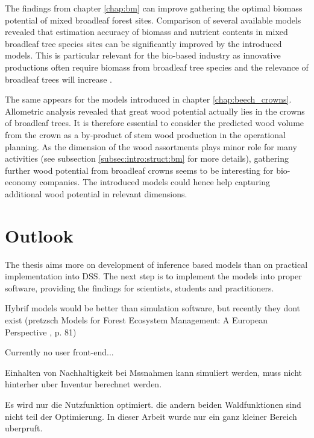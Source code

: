The findings from chapter \ref{chap:bm} can improve gathering the optimal biomass potential of mixed broadleaf forest sites. Comparison of several available models revealed that estimation accuracy of biomass and nutrient contents in mixed broadleaf tree species sites can be significantly improved by the introduced models. This is particular relevant for the bio-based industry as innovative productions often require biomass from broadleaf tree species \citep[p. 1]{auer_2016} and the relevance of broadleaf trees will increase \citep{ti_2014}.

The same appears for the models introduced in chapter \ref{chap:beech_crowns}. Allometric analysis revealed that great wood potential actually lies in the crowns of broadleaf trees. It is therefore essential to consider the predicted wood volume from the crown as a by-product of stem wood production in the operational planning. As the dimension of the wood assortments plays minor role for many activities (see subsection \ref{subsec:intro:struct:bm} for more details), gathering further wood potential from broadleaf crowns seems to be interesting for bio-economy companies. The introduced models could hence help capturing additional wood potential in relevant dimensions.


\section{Outlook}
\label{sec:discussion:outlook}
The thesis aims more on development of inference based models than on practical implementation into DSS. The next step is to implement the models into proper software, providing the findings for scientists, students and practitioners.

Hybrif models would be better than simulation software, but recently they dont exist (pretzsch Models for Forest Ecosystem Management: A European Perspective
, p. 81)

Currently no user front-end...

Einhalten von Nachhaltigkeit bei Mssnahmen kann simuliert werden, muss nicht hinterher uber Inventur berechnet werden.

Es wird nur die Nutzfunktion optimiert. die andern beiden Waldfunktionen sind nicht teil der Optimierung.
In dieser Arbeit wurde nur ein ganz kleiner Bereich uberpruft.
